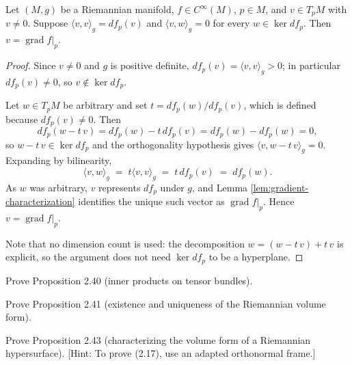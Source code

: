 \begin{lemma}
\label{lem:transversal-representative-eq-gradient}
\leanok
{}
Let $(M,g)$ be a Riemannian manifold, $f \in C^\infty(M)$, $p \in M$, and $v \in T_pM$ with $v \neq 0$. Suppose $\langle v, v\rangle_g = df_p(v)$ and $\langle v, w\rangle_g = 0$ for every $w \in \ker df_p$. Then $v = \operatorname{grad} f|_p$.
\end{lemma}

\begin{proof}
\leanok
Since $v \neq 0$ and $g$ is positive definite, $df_p(v) = \langle v,v\rangle_g > 0$; in particular $df_p(v) \neq 0$, so $v \notin \ker df_p$.

Let $w \in T_pM$ be arbitrary and set $t = df_p(w)/df_p(v)$, which is defined because $df_p(v) \neq 0$. Then
\[
df_p(w - t\,v) = df_p(w) - t\,df_p(v) = df_p(w) - df_p(w) = 0,
\]
so $w - t\,v \in \ker df_p$ and the orthogonality hypothesis gives $\langle v, w - t\,v\rangle_g = 0$. Expanding by bilinearity,
\[
\langle v, w \rangle_g \;=\; t \langle v, v\rangle_g \;=\; t\, df_p(v) \;=\; df_p(w).
\]
As $w$ was arbitrary, $v$ represents $df_p$ under $g$, and Lemma \ref{lem:gradient-characterization} identifies the unique such vector as $\operatorname{grad} f|_p$. Hence $v = \operatorname{grad} f|_p$.

Note that no dimension count is used: the decomposition $w = (w - t\,v) + t\,v$ is explicit, so the argument does not need $\ker df_p$ to be a hyperplane.
\end{proof}

\begin{exercise}\label{prob:inner-products-tensor-bundles}
Prove Proposition 2.40 (inner products on tensor bundles).
\end{exercise}

\begin{exercise}
\label{prob:riemannian-volume-form-existence}
\leanok
{}
Prove Proposition 2.41 (existence and uniqueness of the Riemannian volume form).
\end{exercise}

\begin{exercise}
\label{prob:hypersurface-volume-form}
\leanok
{}
Prove Proposition 2.43 (characterizing the volume form of a Riemannian hypersurface). [Hint: To prove (2.17), use an adapted orthonormal frame.]
\end{exercise}

